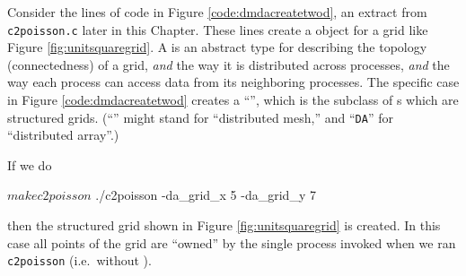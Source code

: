 Consider the lines of code in Figure \ref{code:dmdacreatetwod}, an extract from \texttt{c2poisson.c} later in this Chapter.  These lines create a \PETSc \pDM object for a grid like Figure \ref{fig:unitsquaregrid}.  A \pDM is an abstract type for describing the topology (connectedness) of a grid, \emph{and} the way it is distributed across \MPI processes, \emph{and} the way each process can access data from its neighboring processes.  The specific case in Figure \ref{code:dmdacreatetwod} creates a ``\pDMDA'', which is the subclass of \pDM s which are structured grids.  (``\pDM'' might stand for ``distributed mesh,'' and ``\texttt{DA}'' for ``distributed array''.)


If we do
\begin{cline}
$ make c2poisson
$ ./c2poisson -da_grid_x 5 -da_grid_y 7
\end{cline}
then the structured grid shown in Figure \ref{fig:unitsquaregrid} is created.  In this case all points of the grid are ``owned'' by the single process invoked when we ran \texttt{c2poisson} (i.e.~without \MPI).

